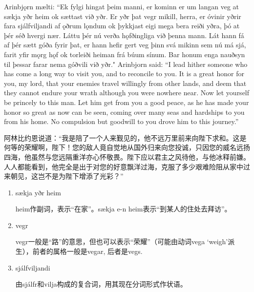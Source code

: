 \begin{paracol}{2}
  Arinbjǫrn mælti: ``Ek fylgi hingat þeim manni, er kominn er um langan veg at sækja yðr heim ok sættast við yðr. Er yðr þat vegr mikill, herra, er óvinir yðrir fara sjálfviljandi af ǫðrum lǫndum ok þykkjast eigi mega bera reiði yðra, þó at þér séð hvergi nær. Láttu þér nú verða hǫfðingliga við þenna mann. Lát hann fá af þér sætt góða fyrir þat, er hann hefir gert veg þinn svá mikinn sem nú má sjá, farit yfir mǫrg hǫf ok torleiði heiman frá búum sínum. Bar honum enga nauðsyn til þessar farar nema góðvili við yðr."
  \switchcolumn
  Arinbjorn said: ``I lead hither someone who has come a long way to visit you, and to reconcile to you. It is a great honor for you, my lord, that your enemies travel willingly from other lands, and deem that they cannot endure your wrath although you were nowhere near. Now let yourself be princely to this man. Let him get from you a good peace, as he has made your honor so great as now can be seen, coming over many seas and hardships to you from his home. No compulsion but goodwill to you drove him to this journey.''
\end{paracol}
\begin{translation*}{}
  阿林比约恩说道：“我是陪了一个人来觐见的，他不远万里前来向陛下求和。这是何等的荣耀啊，陛下！您的敌人竟自觉地从国外归来向您投诚，只因您的威名远扬四海，他虽然与您远隔重洋亦心怀敬畏。陛下应以君主之风待他，与他冰释前嫌。人人都能看到，他完全是出于对您的好意飘洋过海，克服了多少艰难险阻从家中过来朝见，这岂不是为陛下增添了光彩？”
\end{translation*}
\begin{grammar*}{}
  \begin{enumerate}[leftmargin=*]
    \item sækja yðr heim

          heim作副词，表示“在家”。sækja e-n heim表示“到某人的住处去拜访”。
    \item vegr

          vegr一般是“路”的意思，但也可以表示“荣耀”（可能由动词vega `weigh'派生），前者的属格一般是vegar, 后者是vegs.
    \item sjálfviljandi

          由sjálfr和vilja构成的复合词，用其现在分词形式作状语。

  \end{enumerate}
\end{grammar*}


